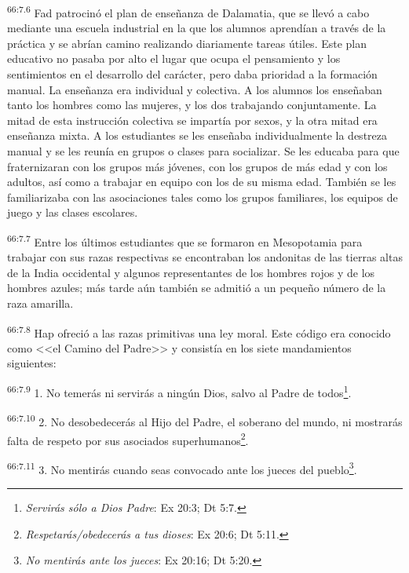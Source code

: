 \par
\textsuperscript{66:7.6} Fad patrocinó el plan de enseñanza de Dalamatia, que se llevó a cabo mediante una escuela industrial en la que los alumnos aprendían a través de la práctica y se abrían camino realizando diariamente tareas útiles. Este plan educativo no pasaba por alto el lugar que ocupa el pensamiento y los sentimientos en el desarrollo del carácter, pero daba prioridad a la formación manual. La enseñanza era individual y colectiva. A los alumnos los enseñaban tanto los hombres como las mujeres, y los dos trabajando conjuntamente. La mitad de esta instrucción colectiva se impartía por sexos, y la otra mitad era enseñanza mixta. A los estudiantes se les enseñaba individualmente la destreza manual y se les reunía en grupos o clases para socializar. Se les educaba para que fraternizaran con los grupos más jóvenes, con los grupos de más edad y con los adultos, así como a trabajar en equipo con los de su misma edad. También se les familiarizaba con las asociaciones tales como los grupos familiares, los equipos de juego y las clases escolares.

\par
\textsuperscript{66:7.7} Entre los últimos estudiantes que se formaron en Mesopotamia para trabajar con sus razas respectivas se encontraban los andonitas de las tierras altas de la India occidental y algunos representantes de los hombres rojos y de los hombres azules; más tarde aún también se admitió a un pequeño número de la raza amarilla.

\par
\textsuperscript{66:7.8} Hap ofreció a las razas primitivas una ley moral. Este código era conocido como <<el Camino del Padre>> y consistía en los siete mandamientos siguientes:

\par
\textsuperscript{66:7.9} 1. No temerás ni servirás a ningún Dios, salvo al Padre de todos\footnote{\textit{Servirás sólo a Dios Padre}: Ex 20:3; Dt 5:7.}.

\par
\textsuperscript{66:7.10} 2. No desobedecerás al Hijo del Padre, el soberano del mundo, ni mostrarás falta de respeto por sus asociados superhumanos\footnote{\textit{Respetarás/obedecerás a tus dioses}: Ex 20:6; Dt 5:11.}.

\par
\textsuperscript{66:7.11} 3. No mentirás cuando seas convocado ante los jueces del pueblo\footnote{\textit{No mentirás ante los jueces}: Ex 20:16; Dt 5:20.}.

